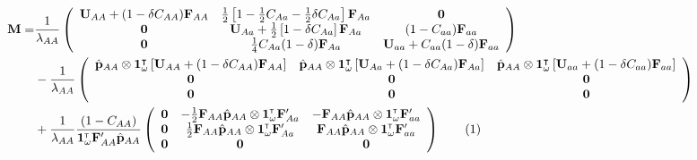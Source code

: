 \documentclass[11pt]{article}
\newcommand\numberthis{\addtocounter{equation}{1}\tag{\theequation}}
\def\mbf#1{\mathbf{#1}}
\newcommand{\tr}{{\mbox{\tiny \sf T}}}
\begin{document}
{
\footnotesize
\begin{align*} \label{eq:combinedM}
	\mbf{M} = 
			& \frac{1}{\lambda_{AA}}\left(
			\begin{array}{ccc}
				\mathbf{U}_{AA}+(1 - \delta C_{AA}) \mbf{F}_{AA}  & \frac{1}{2} \left[1-\frac{1}{2} C_{Aa} - \frac{1}{2} \delta C_{Aa} \right] \mbf{F}_{Aa}  & \mbf{0}\\ 
				\mbf{0} & \mathbf{U}_{Aa} +\frac{1}{2} \left[1- \delta C_{Aa} \right] \mbf{F}_{Aa} & (1 - C_{aa})\mbf{F}_{aa}  \\
				\mbf{0} & \frac{1}{4} C_{Aa} (1 - \delta) \mbf{F}_{Aa}  & \mathbf{U}_{aa} +C_{aa} (1 - \delta) \mbf{F}_{aa} 
			\end{array} \right)\\ 
	&-\frac{1}{\lambda_{AA}} \left(
			\begin{array}{ccc}
				\hat{\mbf{p}}_{AA} \otimes \mbf{1}^{\intercal}_{\omega} \left[\mbf{U}_{AA}+(1 - \delta C_{AA}) \mbf{F}_{AA}\right]  & \hat{\mbf{p}}_{AA} \otimes \mbf{1}^{\intercal}_{\omega} \left[\mbf{U}_{Aa}+(1 - \delta C_{Aa}) \mbf{F}_{Aa}\right] & \hat{\mbf{p}}_{AA} \otimes \mbf{1}^{\intercal}_{\omega} \left[\mbf{U}_{aa}+(1 - \delta C_{aa}) \mbf{F}_{aa}\right] \\ 
				\mbf{0} & \mbf{0} & \mbf{0}  \\
				\mbf{0} & \mbf{0} & \mbf{0} 
			\end{array} \right)\\
			&+\frac{1}{\lambda_{AA}}\frac{(1 - C_{AA})}{\mathbf{1}^\tr_\omega \mathbf{F}_{AA}^\prime \hat{\mathbf{p}}_{AA}} \left(
			\begin{array}{ccc}
				\mbf{0}   & -\frac{1}{2} \mbf{F}_{AA} \hat{\mbf{p}}_{AA} \otimes \mathbf{1}^\tr_{\omega} \mathbf{F}_{Aa}^\prime&  - \mbf{F}_{AA} \hat{\mbf{p}}_{AA} \otimes \mathbf{1}^\tr_{\omega} \mathbf{F}_{aa}^\prime \\ 
						\mbf{0}   & \frac{1}{2} \mbf{F}_{AA} \hat{\mbf{p}}_{AA} \otimes \mathbf{1}^\tr_{\omega} \mathbf{F}_{Aa}^\prime&  \mbf{F}_{AA} \hat{\mbf{p}}_{AA}  \otimes \mathbf{1}^\tr_{\omega} \mathbf{F}_{aa}^\prime \\  
				\mbf{0} & \mbf{0} & \mbf{0} 
			\end{array} \right) 
			\numberthis
\end{align*}
}
\end{document}
